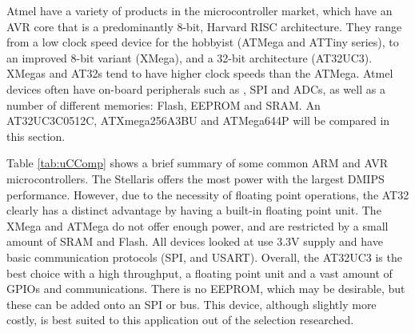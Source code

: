 Atmel have a variety of products in the microcontroller market, which have an AVR core that is a predominantly 8-bit, Harvard RISC architecture. They range from a low clock speed device for the hobbyist (ATMega and ATTiny series), to an improved 8-bit variant (XMega), and a 32-bit architecture (AT32UC3). XMegas and AT32s tend to have higher clock speeds than the ATMega. Atmel devices often have on-board peripherals such as \itc , SPI and ADCs, as well as a number of different memories: Flash, EEPROM and SRAM. An AT32UC3C0512C, ATXmega256A3BU and ATMega644P will be compared in this section. 


Table \ref{tab:uCComp} shows a brief summary of some common ARM and AVR microcontrollers. The Stellaris offers the most power with the largest DMIPS performance. However, due to the necessity of floating point operations, the AT32 clearly has a distinct advantage by having a built-in floating point unit. The XMega and ATMega do not offer enough power, and are restricted by a small amount of SRAM and Flash. All devices looked at use 3.3V supply and have basic communication protocols (SPI, \itc and USART). Overall, the AT32UC3 is the best choice with a high throughput, a floating point unit and a vast amount of GPIOs and communications. There is no EEPROM, which may be desirable, but these can be added onto an SPI or \itc bus. This device, although slightly more costly, is best suited to this application out of the selection researched.

